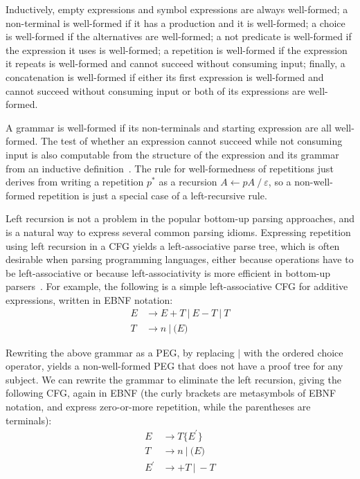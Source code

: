 Inductively, empty expressions and symbol expressions are always
well-formed; a non-terminal is well-formed if it has a production and
it is well-formed; a choice is well-formed if the alternatives are
well-formed; a not predicate is well-formed if the expression it uses is
well-formed; a repetition is well-formed if the expression it repeats
is well-formed and cannot succeed without consuming input; finally, a concatenation is
well-formed if either its first expression is well-formed and cannot
succeed without consuming input or both of its expressions are
well-formed. 

A grammar is well-formed if its non-terminals and starting expression are all
well-formed. The test of whether an expression cannot succeed while
not consuming input is also computable from the structure of the
expression and its grammar from an inductive
definition~\cite{ford:peg}. The rule for well-formedness of
repetitions just derives from writing a repetition $p^*$ as a
recursion $A \leftarrow pA \ /\ \varepsilon$, so a non-well-formed
repetition is just a special case of a left-recursive rule.

Left recursion is not a problem in the popular bottom-up parsing
approaches, and is a natural way to express several common parsing
idioms. Expressing repetition using left recursion in a CFG yields a
left-associative parse tree, which is often desirable when parsing
programming languages, either because operations have to be
left-associative or because left-associativity is more
efficient in bottom-up parsers~\cite{grune}. For example, the following is a simple
left-associative CFG for additive expressions, written in EBNF notation:
\begin{align*}
E & \rightarrow E + T \ | \ E - T \ |\ T \\
T & \rightarrow n \ | \ \boldsymbol{(}E \boldsymbol{)}
\end{align*}

Rewriting the above grammar as a PEG, by replacing $|$ with the ordered
choice operator, yields a non-well-formed PEG that does not have a proof tree for any
subject. We can rewrite the grammar to eliminate the left recursion,
giving the following CFG, again in EBNF (the curly brackets are
metasymbols of EBNF notation, and express zero-or-more
repetition, while the parentheses are terminals):
\begin{align*}
E &\rightarrow T \{E^\prime\} \\
T &\rightarrow n \ | \ \boldsymbol{(}E\boldsymbol{)} \\
E^\prime& \rightarrow + T \ | \ - T
\end{align*}

